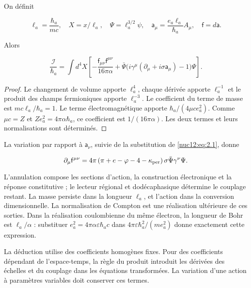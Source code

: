 On définit



\[
\ell_a=\frac{\hbar_a}{mc},\quad X=x/\ell_a,\quad
\Psi=\ell_a^{3/2}\psi,\quad
\mathsf a_\mu=\frac{e_a\ell_a}{\hbar_a}A_\mu,\quad
\mathsf f=d\mathsf a.
\]



Alors



\begin{equation}
\boxed{\frac{\mathcal I}{\hbar_a}=
\int d^4X\left[
-\frac{\mathsf f_{\mu\nu}\mathsf f^{\mu\nu}}{16\pi\alpha}
+\bar\Psi\bigl(i\gamma^\mu(\partial_\mu+i\sigma\mathsf a_\mu)-1\bigr)\Psi
\right].}
\label{nuc12:eq:3.3}
\end{equation}



\begin{proof}
Le changement de volume apporte \(\ell_a^4\), chaque dérivée apporte \(\ell_a^{-1}\) et le produit des champs fermioniques apporte \(\ell_a^{-3}\). Le coefficient du terme de masse est \(mc\ell_a/\hbar_a=1\). Le terme électromagnétique apporte \(\hbar_a/(4\mu c e_a^2)\). Comme \(\mu c=Z\) et \(Ze_a^2=4\pi\alpha\hbar_a\), ce coefficient est \(1/(16\pi\alpha)\). Les deux termes et leurs normalisations sont déterminés.
\end{proof}

La variation par rapport à \(\mathsf a_\nu\), suivie de la substitution de \eqref{nuc12:eq:2.1}, donne




\begin{equation}
\partial_\mu\mathsf f^{\mu\nu}
=4\pi\left(\pi+e-\varphi-4-\kappa_{\rm per}\right)
\sigma\bar\Psi\gamma^\nu\Psi .
\label{nuc12:eq:3.4}
\end{equation}



L’annulation compose les sections d’action, la construction électronique et la réponse constitutive ; le lecteur régional et dodécaphasique détermine le couplage restant. La masse persiste dans la longueur \(\ell_a\), et l’action dans la conversion dimensionnelle. La normalisation de Compton est une réalisation ultérieure de ces sorties. Dans la réalisation coulombienne du même électron, la longueur de Bohr est \(\ell_a/\alpha\) : substituer \(e_a^2=4\pi\alpha\varepsilon\hbar_a c\) dans \(4\pi\varepsilon\hbar_a^2/(m e_a^2)\) donne exactement cette expression.


La déduction utilise des coefficients homogènes fixes. Pour des coefficients dépendant de l’espace-temps, la règle du produit introduit les dérivées des échelles et du couplage dans les équations transformées. La variation d’une action à paramètres variables doit conserver ces termes.

